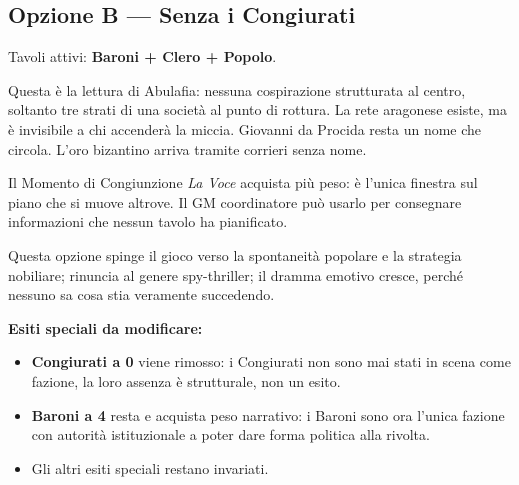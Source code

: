 \secsep

\subsection{Opzione B --- Senza i Congiurati}

Tavoli attivi: \textbf{Baroni + Clero + Popolo}.

Questa è la lettura di Abulafia: nessuna cospirazione strutturata
al centro, soltanto tre strati di una società al punto di rottura.
La rete aragonese esiste, ma è invisibile a chi accenderà la
miccia. Giovanni da Procida resta un nome che circola. L'oro
bizantino arriva tramite corrieri senza nome.

Il Momento di Congiunzione \textit{La Voce} acquista più peso: è
l'unica finestra sul piano che si muove altrove. Il GM coordinatore
può usarlo per consegnare informazioni che nessun tavolo ha
pianificato.

Questa opzione spinge il gioco verso la spontaneità popolare e la
strategia nobiliare; rinuncia al genere spy-thriller; il dramma
emotivo cresce, perché nessuno sa cosa stia veramente succedendo.

\textbf{Esiti speciali da modificare:}
\begin{itemize}[nosep]
  \item \textbf{Congiurati a 0} viene rimosso: i Congiurati non
    sono mai stati in scena come fazione, la loro assenza è
    strutturale, non un esito.
  \item \textbf{Baroni a 4} resta e acquista peso narrativo: i
    Baroni sono ora l'unica fazione con autorità istituzionale a
    poter dare forma politica alla rivolta.
  \item Gli altri esiti speciali restano invariati.
\end{itemize}


\filettodoppio